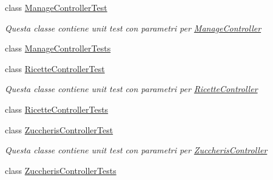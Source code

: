 \begin{DoxyCompactItemize}
\item 
class \mbox{\hyperlink{class_brew_day2_1_1_controllers_1_1_tests_1_1_manage_controller_test}{Manage\+Controller\+Test}}
\begin{DoxyCompactList}\small\item\em Questa classe contiene unit test con parametri per \mbox{\hyperlink{class_brew_day2_1_1_controllers_1_1_manage_controller}{Manage\+Controller}}\end{DoxyCompactList}\item 
class \mbox{\hyperlink{class_brew_day2_1_1_controllers_1_1_tests_1_1_manage_controller_tests}{Manage\+Controller\+Tests}}
\item 
class \mbox{\hyperlink{class_brew_day2_1_1_controllers_1_1_tests_1_1_ricette_controller_test}{Ricette\+Controller\+Test}}
\begin{DoxyCompactList}\small\item\em Questa classe contiene unit test con parametri per \mbox{\hyperlink{class_brew_day2_1_1_controllers_1_1_ricette_controller}{Ricette\+Controller}}\end{DoxyCompactList}\item 
class \mbox{\hyperlink{class_brew_day2_1_1_controllers_1_1_tests_1_1_ricette_controller_tests}{Ricette\+Controller\+Tests}}
\item 
class \mbox{\hyperlink{class_brew_day2_1_1_controllers_1_1_tests_1_1_zuccheris_controller_test}{Zuccheris\+Controller\+Test}}
\begin{DoxyCompactList}\small\item\em Questa classe contiene unit test con parametri per \mbox{\hyperlink{class_brew_day2_1_1_controllers_1_1_zuccheris_controller}{Zuccheris\+Controller}}\end{DoxyCompactList}\item 
class \mbox{\hyperlink{class_brew_day2_1_1_controllers_1_1_tests_1_1_zuccheris_controller_tests}{Zuccheris\+Controller\+Tests}}
\end{DoxyCompactItemize}
